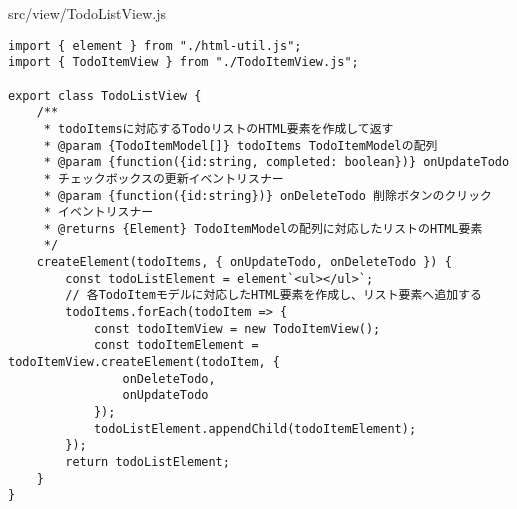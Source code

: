 \begin{listtitle}
src/view/TodoListView.js
\end{listtitle}
\begin{lstlisting}
import { element } from "./html-util.js";
import { TodoItemView } from "./TodoItemView.js";

export class TodoListView {
    /**
     * todoItemsに対応するTodoリストのHTML要素を作成して返す
     * @param {TodoItemModel[]} todoItems TodoItemModelの配列
     * @param {function({id:string, completed: boolean})} onUpdateTodo
     * チェックボックスの更新イベントリスナー
     * @param {function({id:string})} onDeleteTodo 削除ボタンのクリック
     * イベントリスナー
     * @returns {Element} TodoItemModelの配列に対応したリストのHTML要素
     */
    createElement(todoItems, { onUpdateTodo, onDeleteTodo }) {
        const todoListElement = element`<ul></ul>`;
        // 各TodoItemモデルに対応したHTML要素を作成し、リスト要素へ追加する
        todoItems.forEach(todoItem => {
            const todoItemView = new TodoItemView();
            const todoItemElement = todoItemView.createElement(todoItem, {
                onDeleteTodo,
                onUpdateTodo
            });
            todoListElement.appendChild(todoItemElement);
        });
        return todoListElement;
    }
}
\end{lstlisting}
\listend
